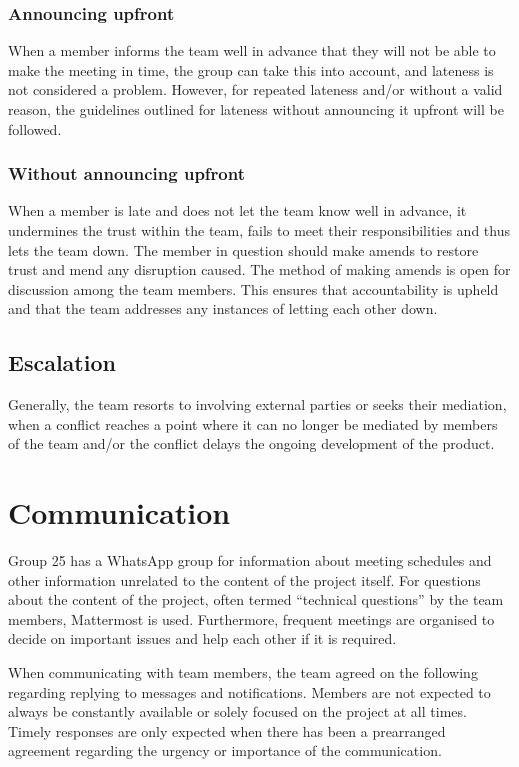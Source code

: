 \documentclass[sigconf,nonacm]{acmart}
\begin{document}
\subsubsection{Announcing upfront}
When a member informs the team well in advance that they will not be able to make the meeting in time, the group can take this into account, and lateness is not considered a problem. However, for repeated lateness and/or without a valid reason, the guidelines outlined for lateness without announcing it upfront will be followed.

\subsubsection{Without announcing upfront}
When a member is late and does not let the team know well in advance, it undermines the trust within the team, fails to meet their responsibilities and thus lets the team down. The member in question should make amends to restore trust and mend any disruption caused. The method of making amends is open for discussion among the team members. This ensures that accountability is upheld and that the team addresses any instances of letting each other down.

\subsection{Escalation}
Generally, the team resorts to involving external parties or seeks their mediation, when a conflict reaches a point where it can no longer be mediated by members of the team and/or the conflict delays the ongoing development of the product.

\section{Communication}
Group 25 has a WhatsApp group for information about meeting schedules and other information unrelated to the content of the project itself. For questions about the content of the project, often termed “technical questions” by the team members, Mattermost is used. Furthermore, frequent meetings are organised to decide on important issues and help each other if it is required.

When communicating with team members, the team agreed on the following regarding replying to messages and notifications. Members are not expected to always be constantly available or solely focused on the project at all times. Timely responses are only expected when there has been a prearranged agreement regarding the urgency or importance of the communication.
\end{document}
